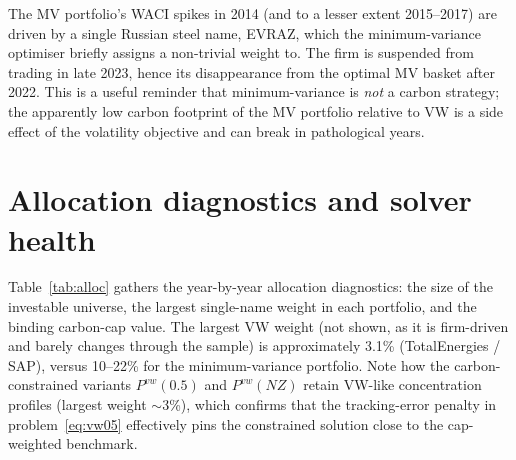 \documentclass[11pt,a4paper]{article}
\begin{document}
The MV portfolio's WACI spikes in 2014 (and to a lesser extent 2015--2017)
are driven by a single Russian steel name, EVRAZ, which the minimum-variance
optimiser briefly assigns a non-trivial weight to. The firm is suspended
from trading in late 2023, hence its disappearance from the optimal MV
basket after 2022. This is a useful reminder that minimum-variance is
\emph{not} a carbon strategy; the apparently low carbon footprint of the
MV portfolio relative to VW is a side effect of the volatility objective
and can break in pathological years.

\section{Allocation diagnostics and solver health}\label{app:alloc}

Table~\ref{tab:alloc} gathers the year-by-year allocation diagnostics:
the size of the investable universe, the largest single-name weight in
each portfolio, and the binding carbon-cap value. The largest VW weight
(not shown, as it is firm-driven and barely changes through the sample)
is approximately 3.1\% (TotalEnergies / SAP), versus 10--22\% for the
minimum-variance portfolio. Note how the carbon-constrained variants
$P^{vw}(0.5)$ and $P^{vw}(NZ)$ retain VW-like concentration profiles
(largest weight $\sim$3\%), which confirms that the tracking-error
penalty in problem~\eqref{eq:vw05} effectively pins the constrained
solution close to the cap-weighted benchmark.
\end{document}
